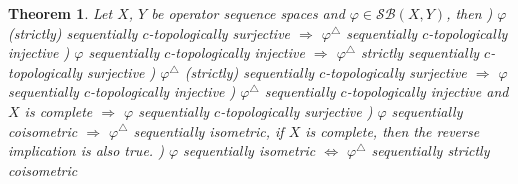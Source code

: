 \documentclass[12pt]{article}
\newtheorem{theorem}{Theorem}[subsection]
\begin{document}
\begin{theorem}\label{ThDualSQOps}
Let $X$, $Y$ be operator sequence spaces and $\varphi\in\mathcal{SB}(X,Y)$, then
) $\varphi$ (strictly) sequentially $c$-topologically surjective $\Longrightarrow$
$ \varphi^\triangle$ sequentially $c$-topologically injective
) $ \varphi$ sequentially $c$-topologically injective $\Longrightarrow$
$ \varphi^\triangle$ strictly sequentially $c$-topologically surjective
) $\varphi^\triangle$ (strictly) sequentially $c$-topologically surjective $\Longrightarrow$
$ \varphi$ sequentially $c$-topologically injective
) $ \varphi^\triangle$ sequentially $c$-topologically injective and $X$ is complete $\Longrightarrow$
$ \varphi$ sequentially $c$-topologically surjective
) $\varphi$ sequentially coisometric $\Longrightarrow$ 
$\varphi^\triangle$ sequentially isometric, if $X$ is complete, then the reverse implication is also true.
) $ \varphi$ sequentially isometric $\Longleftrightarrow$
$\varphi^\triangle$ sequentially strictly coisometric
\end{theorem}
\end{document}
